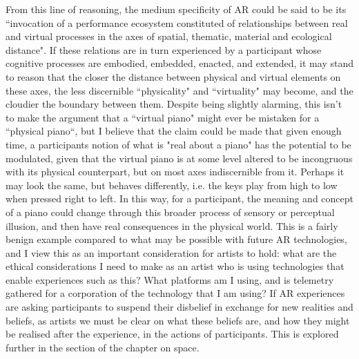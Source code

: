 From this line of reasoning, the medium specificity of AR could be said to be its ``invocation of a performance ecosystem constituted of relationships between real and virtual processes in the axes of spatial, thematic, material and ecological distance". If these relations are in turn experienced by a participant whose cognitive processes are embodied, embedded, enacted, and extended, it may stand to reason that the closer the distance between physical and virtual elements on these axes, the less discernible ``physicality" and ``virtuality" may become, and the cloudier the boundary between them. Despite being slightly alarming, this isn't to make the argument that a ``virtual piano" might ever be mistaken for a ``physical piano``, but I believe that the claim could be made that given enough time, a participants notion of what is "real about a piano" has the potential to be modulated, given that the virtual piano is at some level altered to be incongruous with its physical counterpart, but on most axes indiscernible from it. Perhaps it may look the same, but behaves differently, i.e. the keys play from high to low when pressed right to left. In this way, for a participant, the meaning and concept of a piano could change through this broader process of sensory or perceptual illusion, and then have real consequences in the physical world. This is a fairly benign example compared to what may be possible with future AR technologies, and I view this as an important consideration for artists to hold: what are the ethical considerations I need to make as an artist who is using technologies that enable experiences such as this? What platforms am I using, and is telemetry gathered for a corporation of the technology that I am using? If AR experiences are asking participants to suspend their disbelief in exchange for new realities and beliefs, as artists we must be clear on what these beliefs are, and how they might be realised after the experience, in the actions of participants. This is explored further in the section of the chapter on space.

